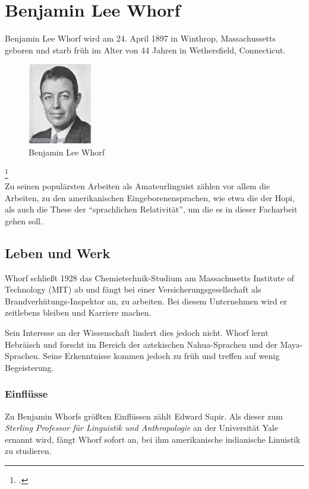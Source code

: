\documentclass[12pt]{scrreprt}
\begin{document}
\chapter{Benjamin Lee Whorf}
\label{chap:bjwhorf}
Benjamin Lee Whorf wird am 24. April 1897 in Winthrop, Massachussetts geboren
und starb früh im Alter von 44 Jahren in Wethersfield, Connecticut.
\begin{figure}[!htb]
	\centering
	\includegraphics[width=0.25\textwidth]{whorf}
	\caption[Benjamin Lee Whorf {\autocite{image:B_L_Whorf}}]{Benjamin Lee Whorf\footnotemark}
	\label{fig:whorf}
\end{figure}
\footcitetext{image:B_L_Whorf}\\
Zu seinen populärsten Arbeiten als Amateurlinguist zählen vor allem die Arbeiten,
zu den amerikanischen Eingeborenensprachen, wie etwa die der Hopi, als auch die
These der \enquote{sprachlichen Relativität}, um die es in dieser Facharbeit
gehen soll.

	\section{Leben und Werk}
	\label{sec:lebenuwerk}
	Whorf schließt 1928 das Chemietechnik-Studium am Massachusetts Institute of
	Technology (MIT) ab und fängt bei einer Versicherungsgesellschaft als
	Brandverhütungs-Inspektor an, zu arbeiten. Bei diesem Unternehmen wird er
	zeitlebens bleiben und Karriere machen.

	Sein Interesse an der Wissenschaft lindert dies jedoch nicht. Whorf lernt
	Hebräisch und forscht im Bereich der aztekischen Nahua-Sprachen und der
	Maya-Sprachen. Seine Erkenntnisse kommen jedoch zu früh und treffen auf wenig
	Begeisterung.
		\subsection{Einflüsse}
		\label{sec:einfluesse}
		Zu Benjamin Whorfs größten Einflüssen zählt Edward Sapir. Als dieser zum
		\textit{Sterling Professor für Linguistik und Anthropologie} an der
		Universität Yale ernannt wird, fängt Whorf sofort an, bei ihm amerikanische
		indianische Linuistik zu studieren.
\end{document}
